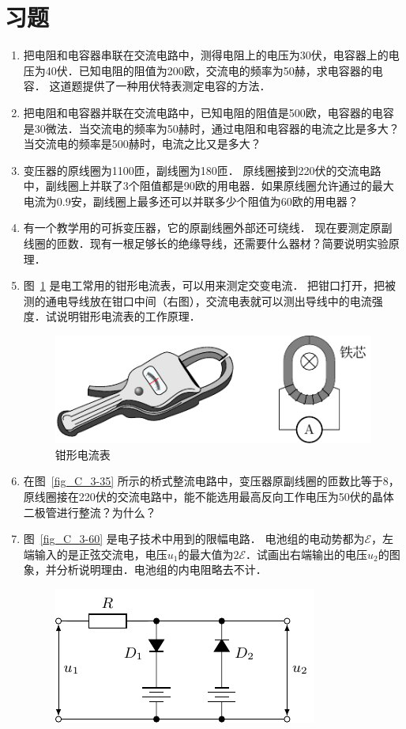\section*{习题}
\begin{enumerate}
    \item 把电阻和电容器串联在交流电路中，测得电阻上的电压为30伏，电容器上的电压为40伏．已知电阻的阻值为200欧，交流电的频率为50赫，求电容器的电容．
    这道题提供了一种用伏特表测定电容的方法．
    \item 把电阻和电容器并联在交流电路中，已知电阻的阻值是500欧，电容器的电容是30微法．当交流电的频率为50赫时，通过电阻和电容器的电流之比是多大？当交流电的频率是500赫时，电流之比又是多大？
    \item 变压器的原线圈为1100匝，副线圈为180匝．
    原线圈接到220伏的交流电路中，副线圈上并联了3个阻值都是90欧的用电器．如果原线圈允许通过的最大电流为0.9安，副线圈上最多还可以并联多少个阻值为60欧的用电器？
    \item 有一个教学用的可拆变压器，它的原副线圈外部还可绕线．
    现在要测定原副线圈的匝数．现有一根足够长的绝缘导线，还需要什么器材？简要说明实验原理．
    \item 图~\ref{fig_C_3-59} 是电工常用的钳形电流表，可以用来测定交变电流．
    把钳口打开，把被测的通电导线放在钳口中间（右图），交流电表就可以测出导线中的电流强度．试说明钳形电流表的工作原理．
    \begin{figure}[htbp]
        \centering
        \includegraphics{fig/C/3-59.pdf}
        \caption{钳形电流表}\label{fig_C_3-59}
    \end{figure}
    \item 在图~\ref{fig_C_3-35} 所示的桥式整流电路中，变压器原副线圈的匝数比等于8，原线圈接在220伏的交流电路中，能不能选用最高反向工作电压为50伏的晶体二极管进行整流？为什么？
    \item 图~\ref{fig_C_3-60} 是电子技术中用到的限幅电路．
    电池组的电动势都为$\mathcal{E}$，左端输入的是正弦交流电，电压$u_1$的最大值为$2\mathcal{E}$．试画出右端输出的电压$u_2$的图象，并分析说明理由．电池组的内电阻略去不计．
    \begin{figure}[htbp]
        \centering
        \includegraphics{fig/C/3-60.pdf}

\end{figure}
\end{enumerate}
